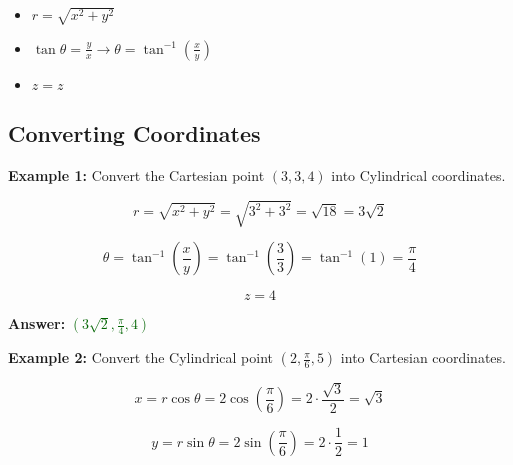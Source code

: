 \documentclass[10pt]{article}                               %
\begin{document}
\begin{adjustwidth}{2em}{0pt}
\begin{adjustwidth}{2em}{0pt}
        \begin{itemize}
            \item \( r = \sqrt{x^2 + y^2} \)
            \item \( \tan\theta = \frac{y}{x}  \rightarrow  \theta = \tan^{-1}\left(\frac{x}{y}\right) \)
            \item \( z = z \)
        \end{itemize}

        \break

        \begin{examplebox}

            \subsection*{Converting Coordinates}
        
            \textbf{Example 1:} Convert the Cartesian point \( \left(3,3,4\right) \) into Cylindrical coordinates.
            \vspace{0.5em}

            \begin{adjustwidth}{2em}{0pt}

                \[ r = \sqrt{x^2 + y^2} = \sqrt{3^2 + 3^2} = \sqrt{18} = 3\sqrt{2} \]

                \[ \theta = \tan^{-1}\left(\frac{x}{y}\right) = \tan^{-1}\left(\frac{3}{3}\right) = \tan^{-1}(1) = \frac{\pi}{4} \]

                \[ z = 4 \]

                \textbf{Answer:} \textcolor{darkgreen}{\( \left(3\sqrt{2}, \frac{\pi}{4}, 4\right) \)}

            \end{adjustwidth}

            \vspace{1em}

            \textbf{Example 2:} Convert the Cylindrical point \( \left(2, \frac{\pi}{6}, 5\right) \) into Cartesian coordinates.
            \vspace{0.5em}

            \begin{adjustwidth}{2em}{0pt}

                \[ x = r\cos\theta = 2\cos\left(\frac{\pi}{6}\right) = 2 \cdot \frac{\sqrt{3}}{2} = \sqrt{3} \]

                \[ y = r\sin\theta = 2\sin\left(\frac{\pi}{6}\right) = 2 \cdot \frac{1}{2} = 1 \]


\end{adjustwidth}
\end{examplebox}
\end{adjustwidth}
\end{adjustwidth}
\end{document}

